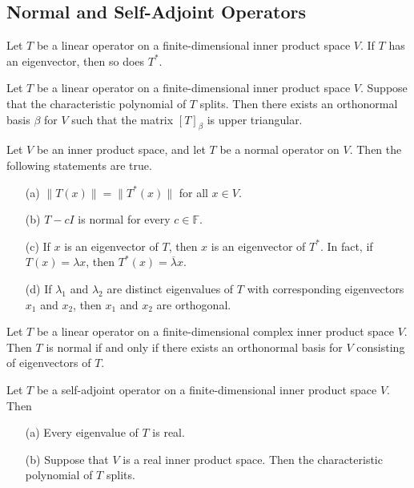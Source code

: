 \subsection{Normal and Self-Adjoint Operators}
\begin{lemma}
    Let \(T\) be a linear operator on a finite-dimensional inner product space \(V\). If \(T\) has an eigenvector, then so does \(T^*\).
\end{lemma}
\vspace{3cm}
\begin{theorem}
    Let \(T\) be a linear operator on a finite-dimensional inner product space \(V\). Suppose that the characteristic polynomial of \(T\) splits. Then there exists an orthonormal basis \(\beta\) for \(V\) such that the matrix \([T]_{\beta}\) is upper triangular.
\end{theorem}
\newpage
\begin{theorem}
    Let \(V\) be an inner product space, and let \(T\) be a normal operator on \(V\). Then the following statements are true.
    \begin{enumerate}
        \item[(a)] \(\lVert T(x) \rVert = \lVert T^*(x) \rVert\) for all \(x \in V\).
        \item[(b)] \(T-cI\) is normal for every \(c \in \mathbb{F}\).
        \item[(c)] If \(x\) is an eigenvector of \(T\), then \(x\) is an eigenvector of \(T^*\). In fact, if \(T(x) = \lambda x\), then \(T^*(x) = \overline{\lambda}x\).
        \item[(d)] If \(\lambda _1\) and \(\lambda _2\) are distinct eigenvalues of \(T\) with corresponding eigenvectors \(x_1\) and \(x_2\), then \(x_1\) and \(x_2\) are orthogonal.
    \end{enumerate}
\end{theorem}
\vspace{5cm} 
\begin{theorem}
    Let \(T\) be a linear operator on a finite-dimensional complex inner product space \(V\). Then \(T\) is normal if and only if there exists an orthonormal basis for \(V\) consisting of eigenvectors of \(T\).
\end{theorem}
\newpage
\begin{lemma}
    Let \(T\) be a self-adjoint operator on a finite-dimensional inner product space \(V\). Then
    \begin{enumerate}
        \item[(a)] Every eigenvalue of \(T\) is real.
        \item[(b)] Suppose that \(V\) is a real inner product space. Then the characteristic polynomial of \(T\) splits. 
    \end{enumerate}
\end{lemma}
